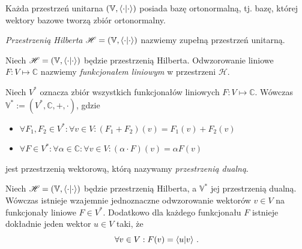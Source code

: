 \documentclass{myclass}
\begin{document}
\begin{theorem}
Każda przestrzeń unitarna \((\mathbb{V}, \braket{\cdot})\) posiada bazę ortonormalną, tj. bazę,
której wektory bazowe tworzą zbiór ortonormalny.
\end{theorem}

\begin{definition}
\textit{Przestrzenią Hilberta} \(\mathscr{H}=(\mathbb{V},\braket{\cdot})\) nazwiemy zupełną
przestrzeń unitarną.
\end{definition}

\begin{definition}
Niech \(\mathscr{H} = (\mathbb{V},\braket{\cdot})\) będzie przestrzenią Hilberta. Odwzorowanie
liniowe \(F:V\mapsto\mathbb{C}\) nazwiemy \textit{funkcjonałem liniowym} w przestrzeni
\(\mathscr{H}\).
\end{definition}

\begin{theorem}
Niech \(V^*\) oznacza zbiór wszystkich funkcjonałów liniowych \(F:V\mapsto\mathbb{C}\). Wówczas
\(\mathbb{V}^*:=(V^*,\mathbb{C},+,\cdot)\), gdzie
\begin{itemize}
    \item \(\forall F_1,F_2 \in V^* : \forall v \in V : (F_1+F_2)(v) = F_1(v) + F_2(v)\)

    \item \(\forall F \in V^* : \forall \alpha \in \mathbb{C} : \forall v \in V : (\alpha \cdot
    F)(v) = \alpha F(v)\)
\end{itemize}
jest przestrzenią wektorową, którą nazywamy \textit{przestrzenią dualną}.
\end{theorem}

\begin{theorem}
Niech \(\mathscr{H}=(\mathbb{V},\braket{\cdot})\) będzie przestrzenią Hilberta, a \(\mathbb{V}^*\)
jej przestrzenią dualną. Wówczas istnieje wzajemnie jednoznaczne odwzorowanie wektorów \(v \in V\)
na funkcjonały liniowe \(F \in V^*\). Dodatkowo dla każdego funkcjonału \(F\) istnieje dokładnie
jeden wektor \(u \in V\) taki, że
\begin{equation*}
    \forall v \in V : F(v) = \braket{u}{v}\,.
\end{equation*}
\end{theorem}
\end{document}
